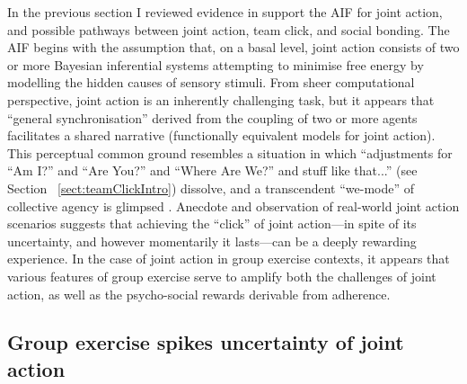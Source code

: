 \begin{CJK}{UTF8}{gbsn}
In the previous section I reviewed evidence in support the AIF for joint action, and possible pathways between joint action, team click, and social bonding.  The AIF begins with the assumption that, on a basal level, joint action consists of two or more Bayesian inferential systems attempting to minimise free energy by modelling the hidden causes of sensory stimuli.  From sheer computational perspective, joint action is an inherently challenging task, but it appears that ``general synchronisation'' derived from the coupling of two or more agents facilitates a shared narrative (functionally equivalent models for joint action).  This perceptual common ground resembles a situation in which ``adjustments for ``Am I?'' and ``Are You?'' and ``Where Are We?'' and stuff like that...'' (see Section ~\ref{sect:teamClickIntro}) dissolve, and a transcendent ``we-mode'' of collective agency is glimpsed \citep[][]{Friston2015}.  Anecdote and observation of real-world joint action scenarios suggests that achieving the ``click'' of joint action---in spite of its uncertainty, and however momentarily it lasts---can be a deeply rewarding experience.  In the case of joint action in group exercise contexts, it appears that various features of group exercise serve to amplify both the challenges of joint action, as well as the psycho-social rewards derivable from adherence.

\subsection{Group exercise spikes uncertainty of joint action}



\end{CJK}
